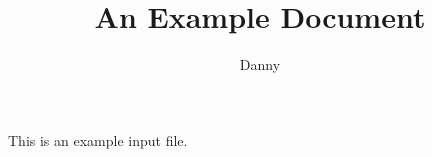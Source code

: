 \documentclass{article}
\title{An Example Document}
\author{Danny}
\begin{document}
\maketitle

This is an example input file.
\end{document}
